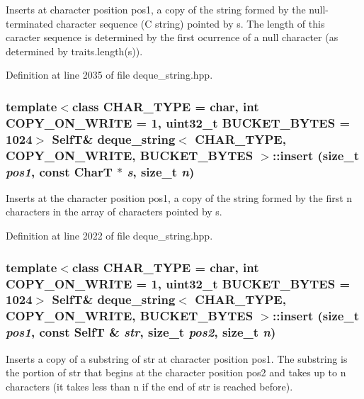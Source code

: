 Inserts at character position pos1, a copy of the string formed by the null-terminated character sequence (C string) pointed by s. The length of this caracter sequence is determined by the first ocurrence of a null character (as determined by traits.length(s)). 

Definition at line 2035 of file deque\_\-string.hpp.\hypertarget{classdeque__string_c547df6a384f56123d3d1a7699ca3d79}{
\subsubsection[{insert}]{\setlength{\rightskip}{0pt plus 5cm}template$<$class CHAR\_\-TYPE  = char, int COPY\_\-ON\_\-WRITE = 1, uint32\_\-t BUCKET\_\-BYTES = 1024$>$ {\bf SelfT}\& {\bf deque\_\-string}$<$ CHAR\_\-TYPE, COPY\_\-ON\_\-WRITE, BUCKET\_\-BYTES $>$::insert (size\_\-t {\em pos1}, \/  const CharT $\ast$ {\em s}, \/  size\_\-t {\em n})}}
\label{classdeque__string_c547df6a384f56123d3d1a7699ca3d79}


Inserts at the character position pos1, a copy of the string formed by the first n characters in the array of characters pointed by s. 

Definition at line 2022 of file deque\_\-string.hpp.\hypertarget{classdeque__string_c273e9d441667b1ff923864a61ad5be1}{
\subsubsection[{insert}]{\setlength{\rightskip}{0pt plus 5cm}template$<$class CHAR\_\-TYPE  = char, int COPY\_\-ON\_\-WRITE = 1, uint32\_\-t BUCKET\_\-BYTES = 1024$>$ {\bf SelfT}\& {\bf deque\_\-string}$<$ CHAR\_\-TYPE, COPY\_\-ON\_\-WRITE, BUCKET\_\-BYTES $>$::insert (size\_\-t {\em pos1}, \/  const {\bf SelfT} \& {\em str}, \/  size\_\-t {\em pos2}, \/  size\_\-t {\em n})}}
\label{classdeque__string_c273e9d441667b1ff923864a61ad5be1}


Inserts a copy of a substring of str at character position pos1. The substring is the portion of str that begins at the character position pos2 and takes up to n characters (it takes less than n if the end of str is reached before). 


